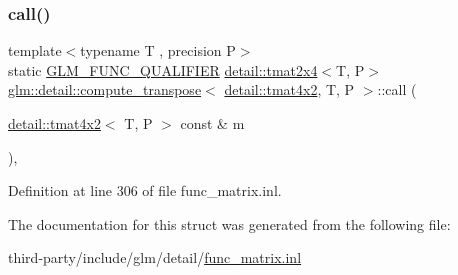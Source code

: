 \subsubsection{\texorpdfstring{call()}{call()}}
{\footnotesize\ttfamily template$<$typename T , precision P$>$ \\
static \hyperlink{setup_8hpp_a33fdea6f91c5f834105f7415e2a64407}{G\+L\+M\+\_\+\+F\+U\+N\+C\+\_\+\+Q\+U\+A\+L\+I\+F\+I\+ER} \hyperlink{structglm_1_1detail_1_1tmat2x4}{detail\+::tmat2x4}$<$T, P$>$ \hyperlink{structglm_1_1detail_1_1compute__transpose}{glm\+::detail\+::compute\+\_\+transpose}$<$ \hyperlink{structglm_1_1detail_1_1tmat4x2}{detail\+::tmat4x2}, T, P $>$\+::call (\begin{DoxyParamCaption}\item[{\hyperlink{structglm_1_1detail_1_1tmat4x2}{detail\+::tmat4x2}$<$ T, P $>$ const \&}]{m }\end{DoxyParamCaption})\hspace{0.3cm}{\ttfamily [inline]}, {\ttfamily [static]}}



Definition at line 306 of file func\+\_\+matrix.\+inl.



The documentation for this struct was generated from the following file\+:\begin{DoxyCompactItemize}
\item 
third-\/party/include/glm/detail/\hyperlink{func__matrix_8inl}{func\+\_\+matrix.\+inl}\end{DoxyCompactItemize}
